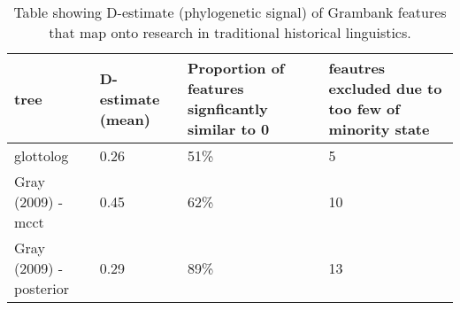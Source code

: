 \begin{table}[ht]
\centering
\begin{tabular}{p{5cm}p{3cm}p{3.5cm}p{3.5cm}}
  \hline
tree & D-estimate (mean) & Proportion of features signficantly similar to 0 & feautres excluded due to too few of minority state \\ 
  \hline
glottolog & 0.26 & 51\% &   5 \\ 
  Gray (2009) - mcct & 0.45 & 62\% &  10 \\ 
  Gray (2009) - posterior & 0.29 & 89\% &  13 \\ 
   \hline
\end{tabular}
\caption{Table showing D-estimate (phylogenetic signal) of Grambank features that map onto research in traditional historical linguistics.} 
\label{d_estimate_summary}
\end{table}
